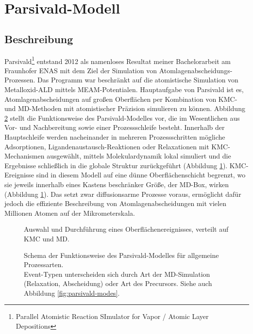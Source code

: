 \section{Parsivald-Modell}
\label{parsivald}


\subsection{Beschreibung}

Parsivald\footnote{Parallel Atomistic Reaction SImulator for Vapor / Atomic Layer Depositions} entstand 2012 als namenloses Resultat meiner Bachelorarbeit\cite{lorenz_entwicklung_2012} am Fraunhofer ENAS mit dem Ziel der Simulation von Atom\-lagen\-abscheidungs-Prozessen.
Das Programm war beschränkt auf die atomistische Simulation von Metall\-oxid-ALD mittels MEAM-Potentialen.
Hauptaufgabe von Parsivald ist es, Atomlagenabscheidungen auf großen Oberflächen per Kombination von KMC- und MD-Methoden mit atomistischer Präzision simulieren zu können.
Abbildung \ref{fig:parsivald-stephierarchy} stellt die Funktionsweise des Parsivald-Modelles vor, die im Wesentlichen aus Vor- und Nachbereitung sowie einer Prozessschleife besteht.
Innerhalb der Hauptschleife werden nacheinander in mehreren Prozessschritten mögliche Adsorptionen, Ligandenaustausch-Reaktionen oder Relaxationen mit KMC-Mechanismen ausgewählt, mittels Molekulardynamik lokal simuliert und die Ergebnisse schließlich in die globale Struktur zurückgeführt (Abbildung \ref{fig:parsivald-schema}).
KMC-Ereignisse sind in diesem Modell auf eine dünne Oberflächenschicht begrenzt, wo sie jeweils innerhalb eines Kastens beschränker Größe, der MD-Box, wirken (Abbildung \ref{fig:parsivald-schema}).
Das setzt zwar diffusionsarme Prozesse voraus, ermöglicht dafür jedoch die effiziente Beschreibung von Atomlagenabscheidungen mit vielen Millionen Atomen auf der Mikrometerskala.

\begin{figure}
  \centering
  \def\svgwidth{\textwidth}
  
  \caption[Parsivald-Schema]{
    Auswahl und Durchführung eines Oberflächenereignisses, verteilt auf KMC und MD.
  }
  \label{fig:parsivald-schema}
\end{figure}

\begin{figure}
  \centering
  \def\svgwidth{\textwidth}
  
  \caption[Parsivald-Funktionsweise asd]{
    Schema der Funktionsweise des Parsivald-Modelles für allgemeine Prozessarten.
    \\
    Event-Typen unterscheiden sich durch Art der MD-Simulation (Relaxation, Abscheidung) oder Art des Precursors.
    Siehe auch Abbildung \ref{fig:parsivald-modes}.
  }
  \label{fig:parsivald-stephierarchy}
\end{figure}

